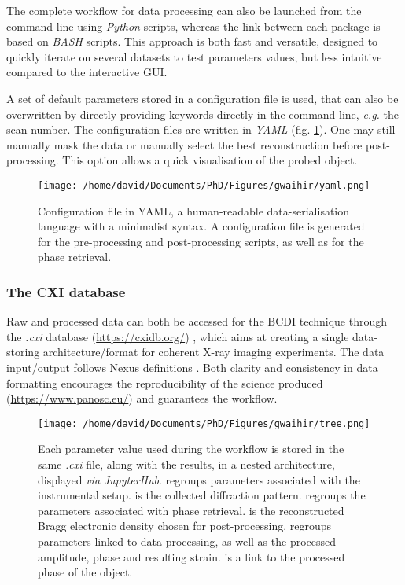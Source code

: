The complete workflow for data processing can also be launched from the command-line using \textit{Python} scripts, whereas the link between each package is based on \textit{BASH} scripts.
This approach is both fast and versatile, designed to quickly iterate on several datasets to test parameters values, but less intuitive compared to the interactive GUI.

A set of default parameters stored in a configuration file is used, that can also be overwritten by directly providing keywords directly in the command line, \textit{e.g.} the scan number.
The configuration files are written in \textit{YAML} (fig. \ref{fig:YAML_file}).
One may still manually mask the data or manually select the best reconstruction before post-processing.
This option allows a quick visualisation of the probed object.

\begin{figure}[!htb]
    \centering
    \texttt{[image: /home/david/Documents/PhD/Figures/gwaihir/yaml.png]}
    \caption{
    Configuration file in YAML, a human-readable data-serialisation language with a minimalist syntax.
    A configuration file is generated for the pre-processing and post-processing scripts, as well as for the phase retrieval.
    }
    \label{fig:YAML_file}
\end{figure}

\subsubsection{The CXI database}

Raw and processed data can both be accessed for the BCDI technique through the \textit{.cxi} database (\url{https://cxidb.org/}) \parencite{Maia2012}, which aims at creating a single data-storing architecture/format for coherent X-ray imaging experiments.
The data input/output follows Nexus definitions \parencite{Konnecke2015}.
Both clarity and consistency in data formatting encourages the reproducibility of the science produced (\url{https://www.panosc.eu/}) and guarantees the workflow.

\begin{figure}[!htb]
    \centering
    \texttt{[image: /home/david/Documents/PhD/Figures/gwaihir/tree.png]}
    \caption{
    Each parameter value used during the workflow is stored in the same \textit{.cxi} file, along with the results, in a nested architecture, displayed \textit{via} \textit{JupyterHub}.
     regroups parameters associated with the instrumental setup.
     is the collected diffraction pattern.
     regroups the parameters associated with phase retrieval.
     is the reconstructed Bragg electronic density chosen for post-processing.
     regroups parameters linked to data processing, as well as the processed amplitude, phase and resulting strain.
     is a link to the processed phase of the object.
    }
    \label{fig:TREE}
\end{figure}

